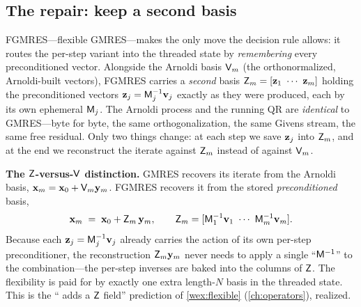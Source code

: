 \subsection{The repair: keep a second basis}

FGMRES---flexible GMRES---makes the only move the decision rule allows: it routes the
per-step variant into the threaded state by \emph{remembering} every preconditioned
vector. Alongside the Arnoldi basis $\mathsf{V}_m$ (the orthonormalized, Arnoldi-built
vectors), FGMRES carries a \emph{second} basis $\mathsf{Z}_m=[\mathbf{z}_1\ \cdots\ \mathbf{z}_m]$
holding the preconditioned vectors $\mathbf{z}_j=\mathsf{M}_j^{-1}\mathbf{v}_j$ exactly as they were
produced, each by its own ephemeral $\mathsf{M}_j$. The Arnoldi process and the running
QR are \emph{identical} to GMRES---byte for byte, the same orthogonalization, the same
Givens stream, the same free residual. Only two things change: at each step we save
$\mathbf{z}_j$ into $\mathsf{Z}_m$, and at the end we reconstruct the iterate against
$\mathsf{Z}_m$ instead of against $\mathsf{V}_m$.

\begin{keyidea}
\textbf{The $\mathsf{Z}$-versus-$\mathsf{V}$ distinction.} GMRES recovers its iterate from
the Arnoldi basis, $\mathbf{x}_m=\mathbf{x}_0+\mathsf{V}_m\mathbf{y}_m$. FGMRES recovers it from the stored
\emph{preconditioned} basis,
\[
  \vx_m \;=\; \vx_0 + \mat{Z}_m\,\vy_m,
  \qquad \mat{Z}_m=[\mat{M}_1^{-1}\vv_1\ \cdots\ \mat{M}_m^{-1}\vv_m].
\]
Because each $\mathbf{z}_j=\mathsf{M}_j^{-1}\mathbf{v}_j$ already carries the action of its own
per-step preconditioner, the reconstruction $\mathsf{Z}_m\mathbf{y}_m$ never needs to apply a
single ``$\mathsf{M}^{-1}$'' to the combination---the per-step inverses are baked into the
columns of $\mathsf{Z}$. The flexibility is paid for by exactly one extra length-$N$ basis
in the threaded state. This is the `` adds a $\mathsf{Z}$ field''
prediction of \cref{wex:flexible} (\cref{ch:operators}), realized.
\end{keyidea}

